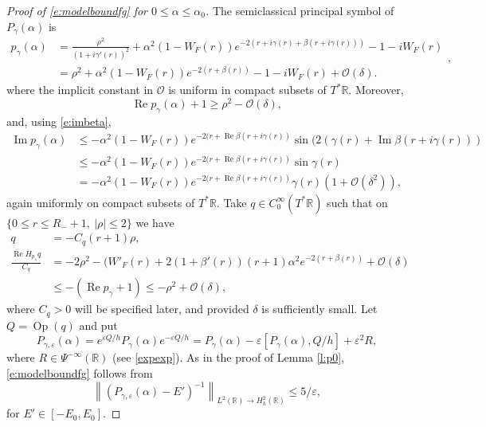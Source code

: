 \documentclass[reqno, 12pt]{amsart}
\newcommand \R {\mathbb{R}}
\newcommand \Oh {\mathcal{O}}
\newcommand \eps {\varepsilon}
\DeclareMathOperator \re {Re}
\DeclareMathOperator \im {Im}
\DeclareMathOperator \Op {Op}
\theoremstyle{definition}
\numberwithin{equation}{section}
\numberwithin{prop}{section}
\numberwithin{figure}{section}
\begin{document}
\begin{proof}[Proof of \eqref{e:modelboundfg} for $0 \le \alpha \le \alpha_0$]
The semiclassical principal symbol of $P_\gamma(\alpha)$ is
\[\begin{split}
p_\gamma(\alpha) &= \frac{\rho^2}{(1 + i\gamma'(r))^2} + \alpha^2(1-W_F(r))e^{-2(r + i \gamma(r) + \beta(r + i \gamma(r)))} - 1 - iW_F(r) \\
&=  \rho^2 + \alpha^2(1-W_F(r))e^{-2(r  + \beta(r ))} - 1 - iW_F(r) + \Oh(\delta).
\end{split},\]
where the implicit constant in $\Oh$ is uniform in compact subsets of $T^*\R$. Moreover,
\[
\re p_\gamma(\alpha) + 1 \ge \rho^2 - \Oh(\delta),
\]
and, using \eqref{e:imbeta},
\begin{equation}\label{e:ima0}
\begin{split}
\im p_\gamma(\alpha) %
& \le -\alpha^2(1-W_F(r))e^{-2(r + \re \beta(r+i\gamma(r))}\sin(2(\gamma(r) + \im \beta(r+ i \gamma(r)))\\
& \le  -\alpha^2(1-W_F(r))e^{-2(r + \re \beta(r+i\gamma(r))}\sin\gamma(r)\\
&=  -\alpha^2(1-W_F(r))e^{-2(r + \re \beta(r + i \gamma(r))}\gamma(r) (1 + \Oh(\delta^2)), %
\end{split}
\end{equation}
again uniformly on compact subsets of $T^*\R$.
Take $q \in C_0^\infty(T^*\R)$ such that on $\{0 \le r \le R_-+1, \ |\rho| \le 2\}$ we have
\[\begin{split}
q &= - C_q (r+1) \rho,\\
\frac{\re H_{p_\gamma} q}{C_q} %
&= -2 \rho^2 -(W'_F(r) + 2(1 + \beta'(r))(r+1)\alpha^2e^{-2(r  + \beta(r))} + \Oh(\delta)%
\\&\le - (\re p_\gamma + 1) \le - \rho^2 + \Oh(\delta),
\end{split}\]
where $C_q>0$ will be specified later, and provided $\delta$ is sufficiently small. Let $Q = \Op(q)$ and put
\[
P_{\gamma,\eps}(\alpha) = e^{\eps Q/h} P_\gamma(\alpha) e^{- \eps Q/h} = P_\gamma(\alpha)  - \eps[P_\gamma(\alpha),Q/h] + \eps^2R,
\]
where $R \in \Psi^{-\infty}(\R)$ (see \eqref{expexp}). As in the proof of Lemma \ref{l:p0}, \eqref{e:modelboundfg} follows from
\begin{equation}\label{e:modelboundfeps0}
\left\|(P_{\gamma,\eps}(\alpha) - E')^{-1} \right\|_{L^2(\R) \to H^2_h (\R)} \le 5/\eps,
\end{equation}
for $E' \in [-E_0,E_0]$. 


\end{proof}
\end{document}
